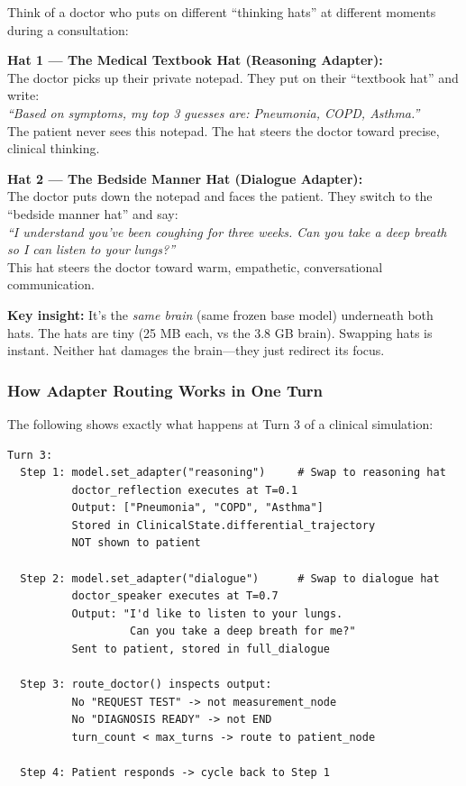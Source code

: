 \begin{analogybox}[\textcolor{white}{Simple Analogy --- Extended}]
Think of a doctor who puts on different ``thinking hats'' at different moments during a consultation:

\textbf{Hat 1 --- The Medical Textbook Hat (Reasoning Adapter):}\\
The doctor picks up their private notepad. They put on their ``textbook hat'' and write:\\
\textit{``Based on symptoms, my top 3 guesses are: Pneumonia, COPD, Asthma.''}\\
The patient never sees this notepad. The hat steers the doctor toward precise, clinical thinking.

\textbf{Hat 2 --- The Bedside Manner Hat (Dialogue Adapter):}\\
The doctor puts down the notepad and faces the patient. They switch to the ``bedside manner hat'' and say:\\
\textit{``I understand you've been coughing for three weeks. Can you take a deep breath so I can listen to your lungs?''}\\
This hat steers the doctor toward warm, empathetic, conversational communication.

\textbf{Key insight:} It's the \textit{same brain} (same frozen base model) underneath both hats. The hats are tiny (25 MB each, vs the 3.8 GB brain). Swapping hats is instant. Neither hat damages the brain---they just redirect its focus.
\end{analogybox}

\subsubsection{How Adapter Routing Works in One Turn}

The following shows exactly what happens at Turn 3 of a clinical simulation:

\begin{verbatim}
Turn 3:
  Step 1: model.set_adapter("reasoning")     # Swap to reasoning hat
          doctor_reflection executes at T=0.1
          Output: ["Pneumonia", "COPD", "Asthma"]
          Stored in ClinicalState.differential_trajectory
          NOT shown to patient

  Step 2: model.set_adapter("dialogue")      # Swap to dialogue hat  
          doctor_speaker executes at T=0.7
          Output: "I'd like to listen to your lungs. 
                   Can you take a deep breath for me?"
          Sent to patient, stored in full_dialogue

  Step 3: route_doctor() inspects output:
          No "REQUEST TEST" -> not measurement_node
          No "DIAGNOSIS READY" -> not END
          turn_count < max_turns -> route to patient_node
          
  Step 4: Patient responds -> cycle back to Step 1
\end{verbatim}

